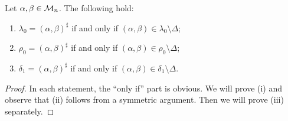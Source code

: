 \begin{lemma}
  \label{lem:low-genpairs}
  Let $\alpha,\beta \in \mathcal{M}_n$.  The following hold:
  \begin{enumerate}[\rm(i)]
  \item $\lambda_0 = (\alpha, \beta)^\sharp$ if and only if
    $(\alpha,\beta) \in \lambda_0 \setminus \Delta$;
  \item $\rho_0 = (\alpha, \beta)^\sharp$ if and only if
    $(\alpha,\beta) \in \rho_0 \setminus \Delta$;
  \item $\delta_1 = (\alpha, \beta)^\sharp$ if and only if
    $(\alpha,\beta) \in \delta_1 \setminus \Delta$.
  \end{enumerate}
  \begin{proof}
    In each statement, the ``only if'' part is obvious.  We will prove (i) and
    observe that (ii) follows from a symmetric argument.  Then we will prove
    (iii) separately. %


\end{proof}
\end{lemma}
